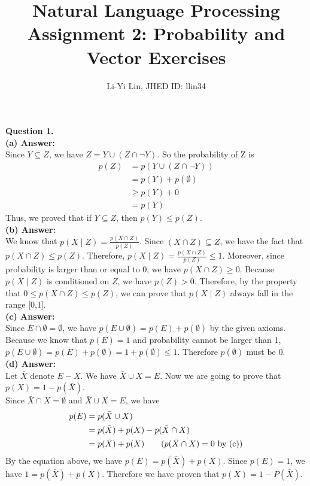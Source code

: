 \documentclass{article}
\title{Natural Language Processing\\Assignment 2: Probability and Vector Exercises}
\author{Li-Yi Lin, JHED ID: llin34}
\date{}
\begin{document}
\maketitle

\noindent
\textbf{Question 1.}\\
\textbf{(a) Answer:}\\
Since $Y \subseteq Z$, we have $Z = Y \cup (Z \cap \neg Y)$. So the probability of Z is
\begin{align*}
  p(Z)
  &= p(Y \cup (Z \cap \neg Y))
  \\ &= p(Y) + p(\emptyset)                   
  \\ &\geq p(Y) + 0         \tag{$p(\emptyset) \geq 0$}
  \\ &= p(Y)  
\end{align*}
Thus, we proved that if $Y \subseteq Z$, then $p(Y) \leq p(Z)$.
\\

\noindent
\textbf{(b) Answer:}\\
We know that $p(X \mid Z) = \frac{p(X \cap Z)}{p(Z)}$. Since $(X \cap Z) \subseteq Z$, we have the fact that $p(X \cap Z) \leq p(Z)$. Therefore, $p(X \mid Z) = \frac{p(X \cap Z)}{p(Z)} \leq 1$. Moreover, since probability is larger than or equal to 0, we have $p(X \cap Z) \geq 0$. Because $p(X \mid Z)$ is conditioned on $Z$, we have $p(Z) > 0$. Therefore, by the property that $0 \leq p(X \cap Z) \leq p(Z)$, we can prove that $p(X \mid Z)$ always fall in the range [0,1].
\\

\noindent
\textbf{(c) Answer:}\\
Since $E \cap \emptyset = \emptyset$, we have $p(E \cup \emptyset) = p(E) + p(\emptyset)$ by the given axioms. Because we know that $p(E) = 1$ and probability cannot be larger than 1, $p(E \cup \emptyset) = p(E) + p(\emptyset) = 1 + p(\emptyset) \leq 1$. Therefore $p(\emptyset)$ must be 0.
\\

\noindent
\textbf{(d) Answer:}\\
Let $\bar{X}$ denote $E - X$. We have $\bar{X} \cup X = E$. Now we are going to prove that $p(X) = 1 - p(\bar{X})$.\\
Since $\bar{X} \cap X = \emptyset$ and $\bar{X} \cup X = E$, we have
\begin{align*}
  p(E)
  &= p(\bar{X} \cup X)
  \\ &= p(\bar{X}) + p(X) - p(\bar{X} \cap X)          
  \\ &= p(\bar{X}) + p(X)       \tag{$p(\bar{X} \cap X) = 0$ by (c)}
\end{align*}
By the equation above, we have $p(E) = p(\bar{X}) + p(X)$. Since $p(E) = 1$, we have $1 = p(\bar{X}) + p(X)$. Therefore we have proven that $p(X) = 1 - P(\bar{X})$.
\\
\end{document}

